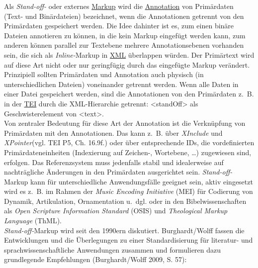 \documentclass{article}
\begin{document}
    Als \emph{Stand-off-} oder externes \href{http://gams.uni-graz.at/o:konde.126}{Markup} wird die \href{http://gams.uni-graz.at/o:konde.17}{Annotation} von Primärdaten (Text- und Binärdateien) bezeichnet, wenn die Annotationen getrennt von den Primärdaten gespeichert werden. Die Idee dahinter ist es, zum einen binäre Dateien annotieren zu können, in die kein Markup eingefügt werden kann, zum anderen können parallel zur Textebene mehrere Annotationsebenen vorhanden sein, die sich als \emph{Inline-}Markup in \href{http://gams.uni-graz.at/o:konde.215}{XML} überlappen würden. Der Primärtext wird auf diese Art nicht oder nur geringfügig durch das eingefügte Markup verändert. Prinzipiell sollten Primärdaten und Annotation auch physisch (in unterschiedlichen Dateien) voneinander getrennt werden. Wenn alle Daten in einer Datei gespeichert werden, sind die Annotationen von den Primärdaten z. B. in der \href{http://gams.uni-graz.at/o:konde.178}{TEI} durch die XML-Hierarchie getrennt: <standOff> als Geschwisterelement von <text>. \\
            
        Von zentraler Bedeutung für diese Art der Annotation ist die Verknüpfung von Primärdaten mit den Annotationen. Das kann z. B. über \emph{XInclude} und \emph{XPointer}(vgl. TEI P5, Ch. 16.9f.) oder über entsprechende IDs, die vordefinierten Primärdateneinheiten (Indexierung auf Zeichen-, Wortebene, …) zugewiesen sind, erfolgen. Das Referenzsystem muss jedenfalls stabil und idealerweise auf nachträgliche Änderungen in den Primärdaten ausgerichtet sein. \emph{Stand-off-}Markup kann für unterschiedliche Anwendungsfälle geeignet sein, aktiv eingesetzt wird es z. B. im Rahmen der \emph{Music Encoding Initiative} (MEI) für Codierung von Dynamik, Artikulation, Ornamentation u. dgl. oder in den Bibelwissenschaften als \emph{Open Scripture Information Standard} (OSIS) und \emph{Theological Markup Language} (ThML).\\
            
        \emph{Stand-off-}Markup wird seit den 1990ern diskutiert. Burghardt/Wolff fassen die Entwicklungen und die Überlegungen zu einer Standardisierung für literatur- und sprachwissenschaftliche Anwendungen zusammen und formulieren dazu grundlegende Empfehlungen  (Burghardt/Wolff 2009, S. 57):\\
            
\end{document}
